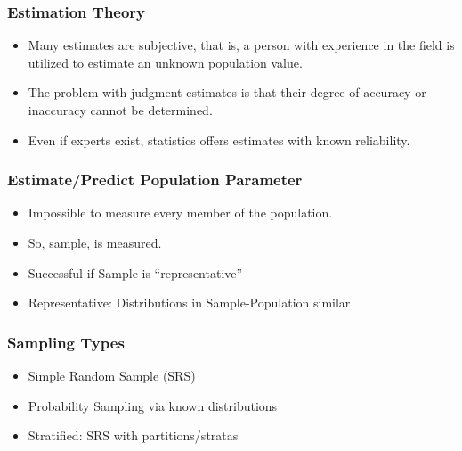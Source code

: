 \begin{frame}[fragile]\frametitle{Estimation Theory}

\begin{itemize}
\item Many estimates are subjective, that is, a person with experience in the field is utilized to estimate an unknown population value.

\item The problem with judgment estimates is that their degree of accuracy or inaccuracy cannot be determined.

\item Even if experts exist, statistics offers estimates with known reliability.

\end{itemize}

\end{frame}

\begin{frame}[fragile]\frametitle{Estimate/Predict Population Parameter}
\begin{itemize}
\item Impossible to measure every member of the population.
\item So, sample, is measured.
\item Successful if Sample is ``representative''
\item Representative: Distributions in Sample-Population similar
\end{itemize}
\end{frame}

\begin{frame}[fragile]\frametitle{Sampling Types}
\begin{itemize}
\item Simple Random Sample (SRS)
\item Probability Sampling via known distributions
\item Stratified: SRS with partitions/stratas
\end{itemize}
\end{frame}

%
%

